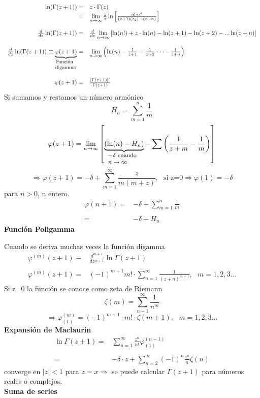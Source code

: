 \documentclass{article}
\theoremstyle{definition}
\begin{document}
\[
\begin{array}{rl}
	\ln(\Gamma (z+1))=& z\cdot\Gamma (z)\\
	=& \lim\limits_{n\to \infty}\frac{z}{z} \ln\left[\frac{n!\cdot n^z}{(z+1)(z_2)\cdot\cdot\cdot (z+n)}\right]\\ \\
	\frac{d}{dz} \ln(\Gamma (z+1))=& \frac{d}{dz}\lim\limits_{n\to \infty}\left[\ln(n!)+z\cdot \ln(n)-\ln(z+1)-\ln(z+2)-...\ln(z+n)\right]\\ \\
	\frac{d}{dz}\ln (\Gamma (z+1))\equiv \underbrace{\varphi (z+1)}_{\parbox{3.5em}{\footnotesize Función digamma}}=& \lim\limits_{n\to \infty}\left( \ln (n)-\frac{1}{z+1}-\frac{1}{z+2}\cdot\cdot\cdot -\frac{1}{z+n}\right)\\ \\
	\varphi (z+1)=& \frac{[\Gamma (z+1)]'}{\Gamma (z+1)}
\end{array}\]
Si sumamos y restamos un número armónico
\[H_n=\sum^n_{m=1}\frac{1}{m}\]
\[\varphi (z+1) =\lim\limits_{n\to \infty} \left[\underbrace{(\ln (n)-H_n)}_{\parbox{4.5em}{\footnotesize $-\delta$\text{ cuando } $n\to\infty$}}-\sum\left(\frac{1}{z+m}-\frac{1}{m}\right)\right]\]
\[\Rightarrow \varphi (z+1) = -\delta +\sum^{\infty}_{m=1}\frac{z}{m(m+z)},\ \ \ \text{si z=0}\Rightarrow\varphi (1)=-\delta\]
para $n>0$, n entero.
\[
\begin{array}{rl}
	\varphi (n+1) =& -\delta +\sum\limits^{n}_{m=1}\frac{1}{m}\\
	\\
	=& -\delta+H_n
\end{array}
\]
\textbf{Función Poligamma}

Cuando se deriva muchas veces la función digamma
\[
\begin{array}{rl}
	\varphi^{(m)} (z+1) \equiv& \frac{d^{m+1}}{dz^{m+1}}\ln\Gamma (z+1)\\
	\\
	\varphi^{(m)} (z+1)=& (-1)^{m+1}m!\cdot \sum\limits^{\infty}_{n=1}\frac{1}{(z+n)^{m+1}},\ \ \ m=1,2,3...
\end{array}
\]
Si z=0 la función se conoce como zeta de Riemann
\[\zeta (m) = \sum^{\infty}_{n-1}\frac{1}{n^m}\]
\[\Rightarrow \varphi^{(m)}_{(1)}=(-1)^{m+1}\cdot m!\cdot \zeta (m+1),\ \ \ m=1,2,3...\]
\textbf{Expansión de Maclaurin}
\[
\begin{array}{rl}
	\ln\Gamma (z+1) =& \sum^{\infty}_{n=1}\frac{z^n}{n!}\varphi^{(n-1)}_{(1)}\\
	\\
	=& -\delta\cdot z +\sum^{\infty}_{n=2}(-1)^n\frac{z^n}{n}\zeta (n)
\end{array}
\]
converge en $|z|<1$ para $z=x\Rightarrow$ se puede calcular $\Gamma (z+1)$ para números reales o complejos.\\
\textbf{Suma de series}
\end{document}
